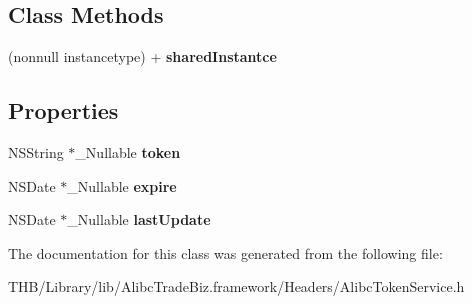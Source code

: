 \subsection*{Class Methods}
\begin{DoxyCompactItemize}
\item 
\mbox{\label{interface_alibc_token_service_a09bc1be194a918447847faafd6218e8d}} 
(nonnull instancetype) + {\bfseries shared\+Instantce}
\end{DoxyCompactItemize}
\subsection*{Properties}
\begin{DoxyCompactItemize}
\item 
\mbox{\label{interface_alibc_token_service_a1a71c633727c658b21d22f0e880cc132}} 
N\+S\+String $\ast$\+\_\+\+Nullable {\bfseries token}
\item 
\mbox{\label{interface_alibc_token_service_a516642c5714c884385c322896b7acc47}} 
N\+S\+Date $\ast$\+\_\+\+Nullable {\bfseries expire}
\item 
\mbox{\label{interface_alibc_token_service_a92e1155b03a3d668e0f841adc4224e00}} 
N\+S\+Date $\ast$\+\_\+\+Nullable {\bfseries last\+Update}
\end{DoxyCompactItemize}


The documentation for this class was generated from the following file\+:\begin{DoxyCompactItemize}
\item 
T\+H\+B/\+Library/lib/\+Alibc\+Trade\+Biz.\+framework/\+Headers/Alibc\+Token\+Service.\+h\end{DoxyCompactItemize}

